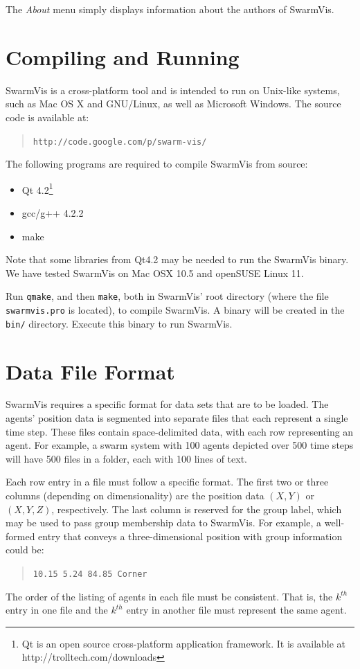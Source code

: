 \documentclass{article}
\begin{document}
The \textit{About} menu simply displays information about the authors of SwarmVis.


\section{Compiling and Running}
SwarmVis is a cross-platform tool
and is intended to run on Unix-like systems, such as Mac OS X and GNU/Linux, as well as Microsoft Windows.
The source code is available at:\begin{quote}\texttt{http://code.google.com/p/swarm-vis/}\end{quote}
The following programs are required to compile SwarmVis from source:
\begin{itemize}
\item Qt 4.2\footnote{Qt is an open source cross-platform application framework. It is available at http://trolltech.com/downloads}
\item gcc/g++ 4.2.2
\item make
\end{itemize}
Note that some libraries from Qt4.2 may be needed to run the SwarmVis binary.
We have tested SwarmVis on Mac OSX 10.5 and openSUSE Linux 11.

Run \texttt{qmake}, and then \texttt{make}, both in SwarmVis' root directory (where the file \texttt{swarmvis.pro} is located), to compile SwarmVis.
A binary will be created in the \texttt{bin/} directory. Execute this binary to run SwarmVis.

\section{Data File Format}\label{fileformat}
SwarmVis requires a specific format for data sets that are to be loaded. The agents' position data is segmented into
separate files that each represent a single time step. These files contain space-delimited data, with
each row representing an agent. For example, a swarm system with 100 agents depicted over 500 time steps
will have 500 files in a folder, each with 100 lines of text.

Each row entry in a file must follow a specific format. The first two or three  columns (depending on dimensionality) are the
position data $(X, Y)$ or $(X, Y, Z)$, respectively. The last column is reserved for the group label, which may be used to pass
group membership data to SwarmVis.
For example, a well-formed entry that conveys a three-dimensional position with group information could be:
\begin{quote}
\texttt{10.15 5.24 84.85 Corner}
\end{quote}
The order of the listing of agents in each file must be consistent.
That is, the $k^{th}$ entry in one file and the $k^{th}$ entry in another file must represent the same agent.
\end{document}
